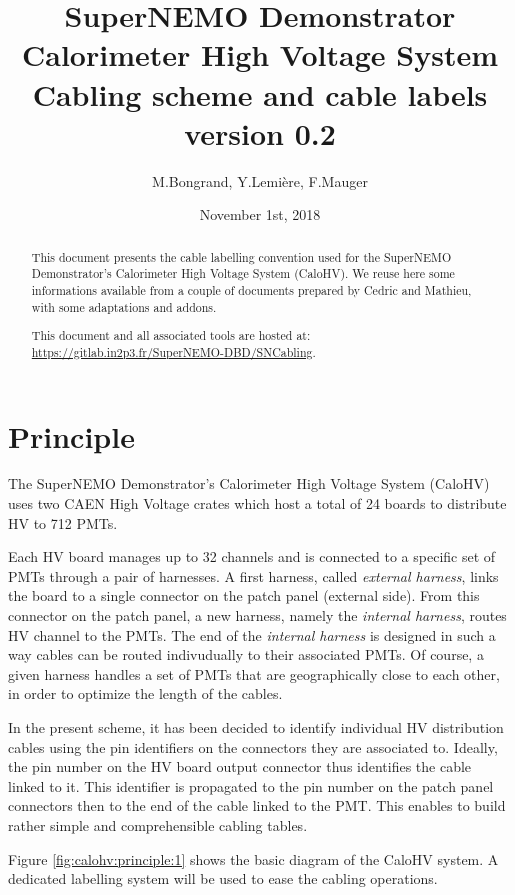 \documentclass[12pt,a4paper]{article}
\title{SuperNEMO Demonstrator\\
  Calorimeter High Voltage System\\
  Cabling scheme and cable labels\\
  version 0.2}
\author{M.Bongrand, Y.Lemi\`ere, F.Mauger}
\date{November 1st, 2018}
\begin{document}
\maketitle

\begin{abstract}
  \noindent This document presents the cable labelling convention used
  for  the SuperNEMO  Demonstrator's Calorimeter  High Voltage  System
  (CaloHV).  We reuse  here some informations available  from a couple
  of documents prepared  by Cedric and Mathieu,  with some adaptations
  and addons.

  \vskip 10pt
  \noindent This document and all associated tools
  are hosted at:
  \vskip 5pt
  \url{https://gitlab.in2p3.fr/SuperNEMO-DBD/SNCabling}.
  
\end{abstract}

\tableofcontents
\vfill

\clearpage
\section{Principle}

The SuperNEMO Demonstrator's Calorimeter  High Voltage System (CaloHV)
uses two CAEN High  Voltage crates which host a total  of 24 boards to
distribute HV to 712 PMTs.

Each HV board manages up to 32 channels and is connected to a specific
set of  PMTs through  a pair  of harnesses.   A first  harness, called
\emph{external harness}, links the board  to a single connector on the
patch panel (external side). From this connector on the patch panel, a
new harness, namely the \emph{internal  harness}, routes HV channel to
the PMTs.  The end of the  \emph{internal harness} is designed in such
a way cables can be routed  indivudually to their associated PMTs.  Of
course, a given harness handles a  set of PMTs that are geographically
close to each other, in order to optimize the length of the cables.

In the present  scheme, it has been decided to  identify individual HV
distribution cables using  the pin identifiers on  the connectors they
are associated  to.  Ideally, the  pin number  on the HV  board output
connector thus identifies the cable  linked to it.  This identifier is
propagated to the pin number on the patch panel connectors then to the
end  of the  cable linked  to the  PMT. This  enables to  build rather
simple and comprehensible cabling tables.

\noindent\par  Figure  \ref{fig:calohv:principle:1}  shows  the  basic
diagram of  the CaloHV  system. A dedicated  labelling system  will be
used to ease the cabling operations.
\end{document}
